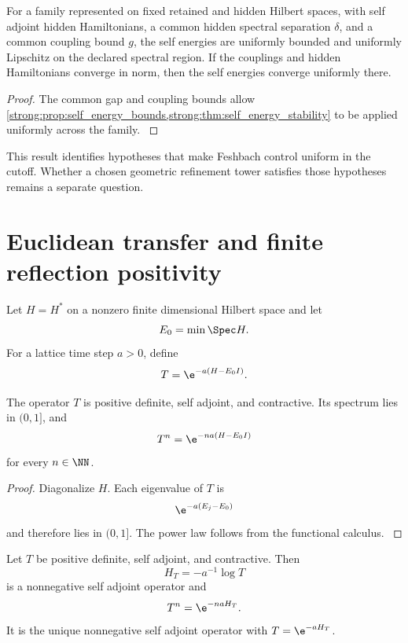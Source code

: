 \begin{corollary}\label{strong:corollary:013}\label{strong:cor:uniform_feshbach}
For a family represented on fixed retained and hidden Hilbert spaces, with self adjoint hidden Hamiltonians, a common hidden spectral separation \(\delta\), and a common coupling bound \(g\), the self energies are uniformly bounded and uniformly Lipschitz on the declared spectral region. If the couplings and hidden Hamiltonians converge in norm, then the self energies converge uniformly there.
\end{corollary}

\begin{proof}\label{strong:proof:055}
The common gap and coupling bounds allow \cref{strong:prop:self_energy_bounds,strong:thm:self_energy_stability} to be applied uniformly across the family.
\label{strong:proof:055:end}\end{proof}

This result identifies hypotheses that make Feshbach control uniform in the cutoff. Whether a chosen geometric refinement tower satisfies those hypotheses remains a separate question.

\section{Euclidean transfer and finite reflection positivity}\label{strong:section:010}\label{strong:sec:euclidean}

Let \(H=H^*\) on a nonzero finite dimensional Hilbert space and let
\[
E_0=\min\Spec H.
\]
For a lattice time step \(a>0\), define
\[
T=\e^{-a(H-E_0I)}.
\]

\begin{theorem}\label{strong:theorem:036}\label{strong:thm:euclidean_transfer}
The operator \(T\) is positive definite, self adjoint, and contractive. Its spectrum lies in \((0,1]\), and
\[
T^n=\e^{-na(H-E_0I)}
\]
for every \(n\in\NN\).
\end{theorem}

\begin{proof}\label{strong:proof:056}
Diagonalize \(H\). Each eigenvalue of \(T\) is
\[
\e^{-a(E_j-E_0)}
\]
and therefore lies in \((0,1]\). The power law follows from the functional calculus.
\label{strong:proof:056:end}\end{proof}

\begin{theorem}\label{strong:theorem:037}\label{strong:thm:transfer_logarithm}
Let \(T\) be positive definite, self adjoint, and contractive. Then
\[
H_T=-a^{-1}\log T
\]
is a nonnegative self adjoint operator and
\[
T^n=\e^{-naH_T}.
\]
It is the unique nonnegative self adjoint operator with \(T=\e^{-aH_T}\).
\end{theorem}

